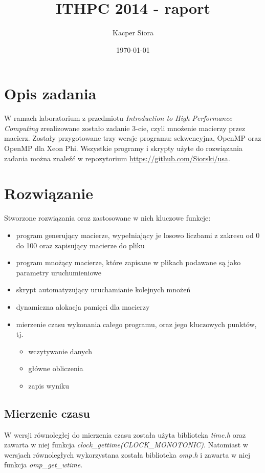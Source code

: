 \documentclass[a4paper]{article}
\title{ITHPC 2014 - raport}
\author{Kacper Siora}
\date{\today}
\begin{document}
\maketitle

\section{Opis zadania}
W ramach laboratorium z przedmiotu \textit{Introduction to High Performance Computing} zrealizowane zostało zadanie 3-cie, czyli mnożenie macierzy przez macierz. Zostały przygotowane trzy wersje programu: sekwencyjna, OpenMP oraz OpenMP dla Xeon Phi. Wszystkie programy i skrypty użyte do rozwiązania zadania można znaleźć w repozytorium \url{https://github.com/Siorski/usa}.

\section{Rozwiązanie}
Stworzone rozwiązania oraz zastosowane w nich kluczowe funkcje:
\begin{itemize}
\item program generujący macierze, wypełniający je losowo liczbami z zakresu od 0 do 100 oraz zapisujący macierze do pliku
\item program mnożący macierze, które zapisane w plikach podawane są jako parametry uruchumieniowe
\item skrypt automatyzujący uruchamianie kolejnych mnożeń
\item dynamiczna alokacja pamięci dla macierzy
\item mierzenie czasu wykonania całego programu, oraz jego kluczowych punktów, tj.  
  \begin{itemize}
  \item wczytywanie danych
  \item główne obliczenia
  \item zapis wyniku
  \end{itemize}
\end{itemize}

\subsection{Mierzenie czasu}
W wersji równoległej do mierzenia czasu została użyta biblioteka \textit{time.h} oraz zawarta w niej funkcja \textit{clock\_gettime(CLOCK\_MONOTONIC)}. Natomiast w wersjach równoległych wykorzystana została biblioteka \textit{omp.h} i zawarta w niej funkcja \textit{omp\_get\_wtime}.
\end{document}
